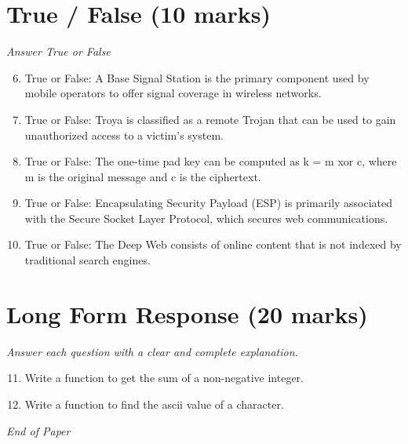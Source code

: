 \documentclass[12pt]{article}
\begin{document}
\section*{True / False (10 marks)}
\textit{Answer True or False}
\begin{enumerate}[label=\arabic*.]
\setcounter{enumi}{5}
\item True or False: A Base Signal Station is the primary component used by mobile operators to offer signal coverage in wireless networks.
\item True or False: Troya is classified as a remote Trojan that can be used to gain unauthorized access to a victim's system.
\item True or False: The one-time pad key can be computed as k = m xor c, where m is the original message and c is the ciphertext.
\item True or False: Encapsulating Security Payload (ESP) is primarily associated with the Secure Socket Layer Protocol, which secures web communications.
\item True or False: The Deep Web consists of online content that is not indexed by traditional search engines.
\end{enumerate}

\section*{Long Form Response (20 marks)}
\textit{Answer each question with a clear and complete explanation.}
\begin{enumerate}[label=\arabic*.]
\setcounter{enumi}{10}
\item Write a function to get the sum of a non-negative integer.
\item Write a function to find the ascii value of a character.
\end{enumerate}

\vfill
\noindent\textit{End of Paper}
\end{document}
